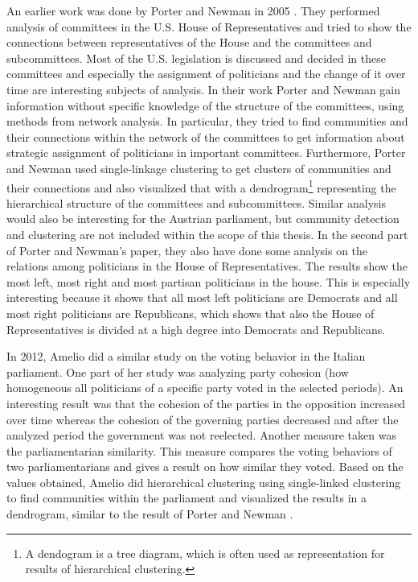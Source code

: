 An earlier work was done by Porter and Newman in 2005 \cite{Porter_2005}. They performed analysis of committees in the U.S. House of Representatives and tried to show the connections between representatives of the House and the committees and subcommittees. Most of the U.S. legislation is discussed and decided in these committees and especially the assignment of politicians and the change of it over time are interesting subjects of analysis. In their work Porter and Newman gain information without specific knowledge of the structure of the committees, using methods from network analysis. In particular, they tried to find communities and their connections within the network of the committees to get information about strategic assignment of politicians in important committees. Furthermore, Porter and Newman used single-linkage clustering to get clusters of communities and their connections and also visualized that with a dendrogram\footnote{A dendogram is a tree diagram, which is often used as representation for results of hierarchical clustering.} representing the hierarchical structure of the committees and subcommittees. Similar analysis would also be interesting for the Austrian parliament, but community detection and clustering are not included within the scope of this thesis. In the second part of Porter and Newman's paper, they also have done some analysis on the relations among politicians in the House of Representatives. The results show the most left, most right and most partisan politicians in the house. This is especially interesting because it shows that all most left politicians are Democrats and all most right politicians are Republicans, which shows that also the House of Representatives is divided at a high degree into Democrats and Republicans.

In 2012, Amelio \cite{Amelio_2012} did a similar study on the voting behavior in the Italian parliament. One part of her study was analyzing party cohesion (how homogeneous all politicians of a specific party voted in the selected periods). An interesting result was that the cohesion of the parties in the opposition increased over time whereas the cohesion of the governing parties decreased and after the analyzed period the government was not reelected. Another measure taken was the parliamentarian similarity. This measure compares the voting behaviors of two parliamentarians and gives a result on how similar they voted. Based on the values obtained, Amelio did hierarchical clustering using single-linked clustering to find communities within the parliament and visualized the results in a dendrogram, similar to the result of Porter and Newman \cite{Porter_2005}. 

